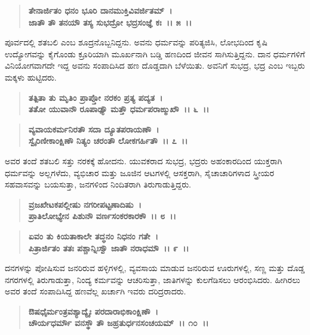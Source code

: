 \begin{verse}
\textbf{ತೇನಾರ್ಜಿತಂ ಧನಂ ಭೂರಿ ದಾನಮುಕ್ತಿವಿವರ್ಜಿತಮ್~।}\\\textbf{ಜಾತೌ ತೌ ತನಯೌ ತಸ್ಯ ಸುಭದ್ರೋ ಭದ್ರಸಂಜ್ಞೆ ಕಃ~।। ೫~।।}
\end{verse}

ಪೂರ್ವದಲ್ಲಿ ಶತಬಲಿ ಎಂಬ ಶೂದ್ರನೊಬ್ಬನಿದ್ದನು. ಅವನು ಧರ್ಮವನ್ನು ಪರಿತ್ಯಜಿಸಿ, ಲೋಭದಿಂದ ಕೃಷಿ ಉದ್ಯೋಗವನ್ನು ಕೈಗೊಂಡು ಕ್ರೂರಿಯಾಗಿ ಮೂರ್ಖನಾಗಿ ಬಡ್ಡಿ ಹಣದಿಂದ ಜೀವನ ಸಾಗಿಸುತ್ತಿದ್ದನು. ದಾನ ಧರ್ಮಗಳಿಗೆ ವಿನಿಯೋಗವಾಗದೇ ಇದ್ದ ಅವನು ಸಂಪಾದಿಸಿದ ಹಣ ದೊಡ್ಡದಾಗಿ ಬೆಳೆಯಿತು. ಅವನಿಗೆ ಸುಭದ್ರ, ಭದ್ರ ಎಂಬ ಇಬ್ಬರು ಮಕ್ಕಳು ಹುಟ್ಟಿದರು.

\begin{verse}
\textbf{ತತ್ಪಿತಾ ತು ಮೃತಿಂ ಪ್ರಾಪ್ತೋ ನರಕಂ ಪ್ರತ್ಯ ಪದ್ಯತ~।}\\\textbf{ತತೋ ಯುವಾನೌ ರೂಪಾಢ್ಯೌ ಮತ್ತೌ ಧರ್ಮಪರಾಙ್ಮುಖೌ~।। ೬~।। }
\end{verse}

\begin{verse}
\textbf{ವ್ಯವಾಯಕರ್ಮನಿರತೌ ಸದಾ ದ್ಯೂತಪರಾಯಣೌ~।}\\\textbf{ಸ್ವೈರಿಣೀಕಾಂಕ್ಷಿಣೌ ನಿತ್ಯಂ ಚರಂತೌ ಲೋಕಗರ್ಹಿತೌ~।। ೭~।।}
\end{verse}

ಅವರ ತಂದೆ ಶತಬಲಿ ಸತ್ತು ನರಕಕ್ಕೆ ಹೋದನು. ಯುವಕರಾದ ಸುಭದ್ರ, ಭದ್ರರು ಅಹಂಕಾರದಿಂದ ಯುಕ್ತರಾಗಿ ಧರ್ಮವನ್ನು ಅಲ್ಲಗಳೆದು, ವ್ಯಭಿಚಾರ ಮತ್ತು ಜೂಜಿನ ಆಟಗಳಲ್ಲಿ ಆಸಕ್ತರಾಗಿ, ಸೈಚಾಚಾರಿಗಳಾದ ಸ್ತ್ರೀಯರ ಸಹವಾಸವನ್ನು ಬಯಸುತ್ತಾ, ಜನಗಳಿಂದ ನಿಂದಿತರಾಗಿ ತಿರುಗಾಡುತ್ತಿದ್ದರು.

\begin{verse}
\textbf{ವ್ರಜಖೇಟಕಪಲ್ಲೀಷು ನಗರೀಪಟ್ಟಣಾದಿಷು~।}\\\textbf{ಪ್ರಾತಿಲೋಭ್ಯೇನ ಪಿಶುನೌ ವರ್ಣಸಂಕರಕಾರಕೌ~।। ೮~।। }
\end{verse}

\begin{verse}
\textbf{ಏವಂ ತು ಕಿಯತಾಕಾಲೇ ತದ್ಧನಂ ನಿಧನಂ ಗತೇ~।}\\\textbf{ಪಿತ್ರಾರ್ಜಿತಂ ತತಃ ಪಶ್ಚಾನ್ನಿಃಸ್ವೌ ಜಾತೌ ನರಾಧಮೌ~।। ೯~।।}
\end{verse}

ದನಗಳನ್ನು ಪೋಷಿಸುವ ಜನರಿರುವ ಹಳ್ಳಿಗಳಲ್ಲಿ, ವ್ಯವಸಾಯ ಮಾಡುವ ಜನರಿರುವ ಊರುಗಳಲ್ಲಿ, ಸಣ್ಣ ಮತ್ತು ದೊಡ್ಡ ನಗರಗಳಲ್ಲಿ ತಿರುಗಾಡುತ್ತಾ, ನಿಂದ್ಯ ಕರ್ಮವನ್ನು ಆಚರಿಸುತ್ತಾ, ಜಾತಿಗಳನ್ನು ಕುಲಗೆಡಿಸಲು ಆರಂಭಿಸಿದರು. ಹೀಗಿರಲು ಅವರ ತಂದೆ ಸಂಪಾದಿಸಿದ್ದ ಹಣವೆಲ್ಲ ಖರ್ಚಾಗಿ ಇವರು ದರಿದ್ರರಾದರು.

\begin{verse}
\textbf{ಔಷಧೈರ್ಮಂತ್ರವಶ್ಯಾದ್ಯೈಃ ಪರದಾರಾಭಿಕಾಂಕ್ಷಿಣೌ~।}\\\textbf{ಚೌರ್ಯಧರ್ಮೌ ವನಸ್ಥೌ ತೌ ಜಹ್ರತುರ್ಧನಸಂಚಯಮ್~।। ೧೦~।।}
\end{verse}


